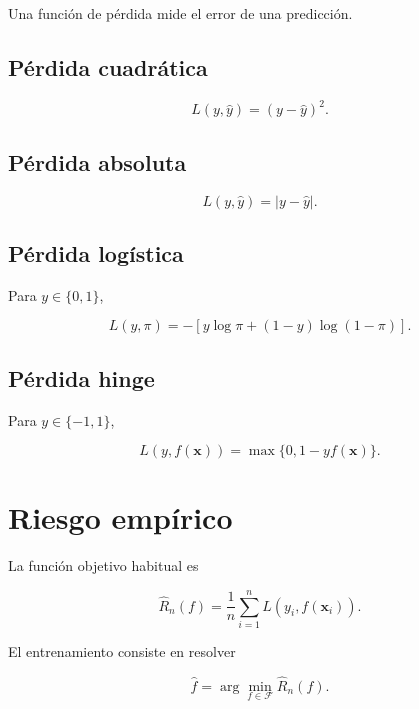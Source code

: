 \documentclass[
  spanish,
  10.5pt,
  letterpaper,
  DIV=11,
  numbers=noendperiod,
  oneside,
  open=any]{scrreprt}
\theoremstyle{definition}
\theoremstyle{definition}
\theoremstyle{plain}
\theoremstyle{remark}
\begin{document}

Una función de pérdida mide el error de una predicción.

\subsection*{Pérdida cuadrática}\label{puxe9rdida-cuadruxe1tica}

\[
L(y,\widehat{y})
=
(y-\widehat{y})^2.
\]

\subsection*{Pérdida absoluta}\label{puxe9rdida-absoluta}

\[
L(y,\widehat{y})
=
|y-\widehat{y}|.
\]

\subsection*{Pérdida logística}\label{puxe9rdida-loguxedstica}

Para \(y\in\{0,1\}\),

\[
L(y,\pi)
=
-
\left[
y\log\pi
+
(1-y)\log(1-\pi)
\right].
\]

\subsection*{Pérdida hinge}\label{puxe9rdida-hinge}

Para \(y\in\{-1,1\}\),

\[
L(y,f(\mathbf{x}))
=
\max
\{
0,
1-yf(\mathbf{x})
\}.
\]

\section*{Riesgo empírico}\label{riesgo-empuxedrico}


La función objetivo habitual es

\[
\widehat{R}_n(f)
=
\frac{1}{n}
\sum_{i=1}^{n}
L(
y_i,
f(\mathbf{x}_i)
).
\]

El entrenamiento consiste en resolver

\[
\widehat{f}
=
\arg\min_{f\in\mathcal{F}}
\widehat{R}_n(f).
\]
\end{document}
